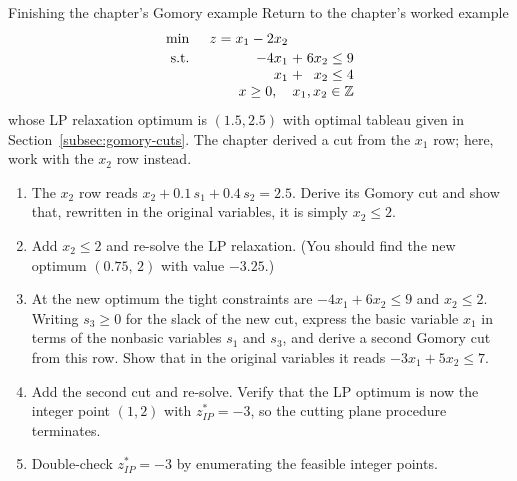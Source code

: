 \begin{ex}{Finishing the chapter's Gomory example}{}
\label{ex:ch13-gomory-finish}
Return to the chapter's worked example
\[
\begin{array}{l r@{\;}c@{\;}r@{\;}c@{\;}r}
\min & z = x_1 - 2x_2 & & & & \\[2pt]
\st  & -4x_1 & + & 6x_2 & \leq & 9 \\
     & x_1   & + & x_2  & \leq & 4 \\
     & \multicolumn{5}{r}{x \geq 0, \quad x_1, x_2 \in \Z}
\end{array}
\]
whose LP relaxation optimum is $(1.5, 2.5)$ with optimal tableau given in
Section~\ref{subsec:gomory-cuts}.  The chapter derived a cut from the $x_1$
row; here, work with the $x_2$ row instead.
\begin{enumerate}
\item The $x_2$ row reads $x_2 + 0.1\,s_1 + 0.4\,s_2 = 2.5$.  Derive its
Gomory cut and show that, rewritten in the original variables, it is simply
$x_2 \leq 2$.
\item Add $x_2 \leq 2$ and re-solve the LP relaxation.  (You should find the
new optimum $(0.75,\, 2)$ with value $-3.25$.)
\item At the new optimum the tight constraints are $-4x_1 + 6x_2 \leq 9$ and
$x_2 \leq 2$.  Writing $s_3 \geq 0$ for the slack of the new cut, express the
basic variable $x_1$ in terms of the nonbasic variables $s_1$ and $s_3$, and
derive a second Gomory cut from this row.  Show that in the original
variables it reads $-3x_1 + 5x_2 \leq 7$.
\item Add the second cut and re-solve.  Verify that the LP optimum is now the
integer point $(1, 2)$ with $z^*_{IP} = -3$, so the cutting plane procedure
terminates.
\item Double-check $z^*_{IP} = -3$ by enumerating the feasible integer
points.
\end{enumerate}
\exrefs{\S\ref{subsec:gomory-cuts}; \S\ref{subsec:cutting-plane-procedure}}
\end{ex}

